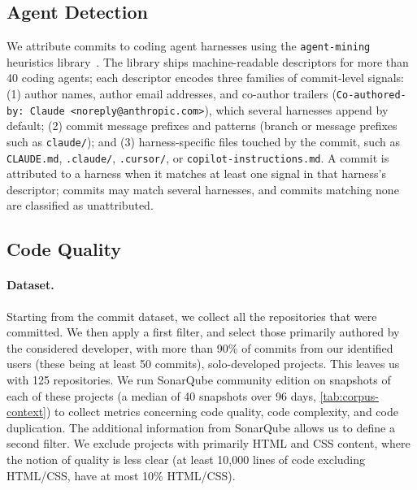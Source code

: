 \documentclass[smallextended]{svjour3}
\begin{document}
\subsection{Agent Detection}
\label{sec:dataset-agents}

We attribute commits to coding agent harnesses using the \texttt{agent-mining} heuristics library~\cite{Robbes2026}.
The library ships machine-readable descriptors for more than 40 coding agents; each descriptor encodes three families of commit-level signals: (1) author names, author email addresses, and co-author trailers (\eg \texttt{Co-authored-by: Claude <noreply@anthropic.com>}), which several harnesses append by default; (2) commit message prefixes and patterns (\eg branch or message prefixes such as \texttt{claude/}); and (3) harness-specific files touched by the commit, such as \texttt{CLAUDE.md}, \texttt{.claude/}, \texttt{.cursor/}, or \texttt{copilot-instructions.md}.
A commit is attributed to a harness when it matches at least one signal in that harness's descriptor; commits may match several harnesses, and commits matching none are classified as unattributed.

\subsection{Code Quality}
\label{sec:dataset-quality}
\paragraph{Dataset.}
Starting from the commit dataset, we collect all the repositories that were committed. We then apply a first filter, and select those primarily authored by the considered developer, \ie  with more than 90\% of commits from our identified users (these being at least 50 commits), \ie solo-developed projects.
This leaves us with 125 repositories.
We run SonarQube community edition on snapshots of each of
these projects (a median of 40 snapshots over 96 days, \autoref{tab:corpus-context}) to collect metrics concerning code quality, code complexity, and code duplication.
The additional information from SonarQube allows us to define a second filter. We exclude projects with primarily HTML and CSS content, where the notion of quality is less clear (at least 10{,}000 lines of code excluding HTML/CSS, have at most 10\% HTML/CSS).
\end{document}
